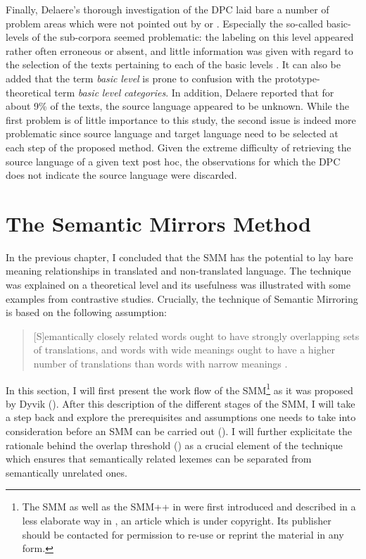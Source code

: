 Finally, Delaere’s thorough investigation of the DPC laid bare a number of problem areas which were not pointed out by \citet{spyns_dutch_2013} or \citet{macken_dutch_2011}. Especially the so-called basic-levels of the sub-corpora seemed problematic: the labeling on this level appeared rather often erroneous or absent, and little information was given with regard to the selection of the texts pertaining to each of the basic levels \citep[52]{delaere_translations_2015}. It can also be added that the term \textit{basic} \textit{level} is prone to confusion with the prototype-theoretical term \textit{basic} \textit{level} \textit{categories}. In addition, Delaere reported that for about 9\% of the texts, the source language appeared to be unknown. While the first problem is of little importance to this study, the second issue is indeed more problematic since source language and target language need to be selected at each step of the proposed method. Given the extreme difficulty of retrieving the source language of a given text post hoc, the observations for which the DPC does not indicate the source language were discarded.


\section{The Semantic Mirrors Method}
\label{sec:3.4}
In the previous chapter, I concluded that the SMM has the potential to lay bare meaning relationships in translated and non-translated language. The technique was explained on a theoretical level and its usefulness was illustrated with some examples from contrastive studies. Crucially, the technique of Semantic Mirroring is based on the following assumption:

\begin{quote}
[S]emantically closely related words ought to have strongly overlapping sets of translations, and words with wide meanings ought to have a higher number of translations than words with narrow meanings \citep[311]{aijmer_translations_2004}.
\end{quote}

In this section, I will first present the work flow of the SMM\footnote{The SMM as well as the SMM++ in  were first introduced and described in a less elaborate way in \citet{vandevoorde_corpus-based_2017}, an article which is under copyright. Its publisher should be contacted for permission to re-use or reprint the material in any form.} as it was proposed by Dyvik (). After this description of the different stages of the SMM, I will take a step back and explore the prerequisites and assumptions one needs to take into consideration before an SMM can be carried out (). I will further explicitate the rationale behind the overlap threshold () as a crucial element of the technique which ensures that semantically related lexemes can be separated from semantically unrelated ones.


